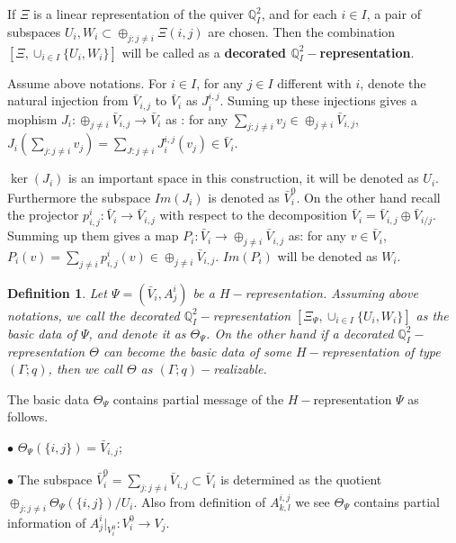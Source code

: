\def\CTEXPreproc{Created by ctex v0.2.12, don't edit!}\documentclass[11pt]{article}
\newtheorem{defi}{Definition}[section]
\begin{document}
If $\Xi $ is a linear representation of the quiver $\mathbb{Q}^2 _{I}$, and for each $i\in I$, a pair of subspaces
$U_i ,W_i \subset \oplus_{j:j\neq i} \Xi({i,j}) $ are chosen. Then the combination $[ \Xi , \cup_{i\in I} \{ U_i , W_i \}   ]$ will be called as a \textbf{decorated $\mathbb{Q}^2 _{I}-$representation}.

 Assume above notations. For $i\in I$, for any $j\in I$ different with $i$, denote the natural injection from $\bar{V}_{i,j}$ to $\bar{V}_i $ as $J^{i,j} _i $. Suming up these injections gives a mophism
 $J_i  : \oplus_{j\neq i} \bar{V}_{i,j} \longrightarrow \bar{V}_i $ as :
 for any $\sum_{j:j\neq i} v_j \in  \oplus_{j\neq i} \bar{V}_{i,j} $,
 $J_i ( \sum_{j:j\neq i} v_j   ) = \sum_{J:j\neq i} J^{i,j} _i (v_j ) \in \bar{V}_i $.

 $\ker (J_i   )  $ is an important space in this construction, it will be denoted as $U_i$. Furthermore the subspace
 $Im ( J_i )$ is denoted as $ \bar{V}^0 _i $. On the other hand recall the projector $p^i _{i,j} : \bar{V}_i \longrightarrow \bar{V}_{i,j}$ with respect to the decomposition $\bar{V}_i = \bar{V}_{i,j} \oplus \bar{V}_{i/j}$.  Summing up them gives a map $P_i : \bar{V}_i \longrightarrow \oplus_{j\neq i} \bar{V}_{i,j} $ as:
for any $ v\in \bar{V}_i $, $P_i (v) = \sum _{j\neq i} p^i _{i,j}(v) \in \oplus_{j\neq i} \bar{V}_{i,j} $.
 $Im (  P_i )$ will be denoted as $W_i$.


\begin{defi}
 Let $\Psi=( \bar{V}_i , A^i _j  )$ be a $H-$representation.  Assuming above notations,  we call the decorated $\mathbb{Q}^2 _{I}-$representation $[ \Xi_{\Psi} , \cup_{i\in I} \{ U_i ,W_i \} ] $ as the basic data of  $\Psi$,  and denote it as $\Theta_{\Psi}$.  On the other hand if a decorated $\mathbb{Q}^2 _{I}-$representation $\Theta$  can become the basic data of some $H-$representation of type $(\Gamma;q)$, then we call $\Theta$ as $(\Gamma ;q)-$realizable.
\end{defi}


The basic data $\Theta_{\Psi}$ contains partial message of the $H-$representation $\Psi$ as follows.

\noindent$\bullet $ $\Theta_{\Psi} (\{ i,j\} )= \bar{V}_{i,j}$;

\noindent$\bullet $ The subspace $\bar{V}^0 _i = \sum_{j:j\neq i} \bar{V}_{i,j}\subset \bar{V}_i $ is determined as the quotient $\oplus_{j:j\neq i} \Theta_{\Psi}  (\{i,j\}) / U_i $. Also from definition of
$A^{i,j} _{k,l} $ we see $\Theta_{\Psi}$ contains partial information of $ A^i _j | _{V^0 _i} : V^0 _i   \rightarrow V_j  $.
\end{document}

